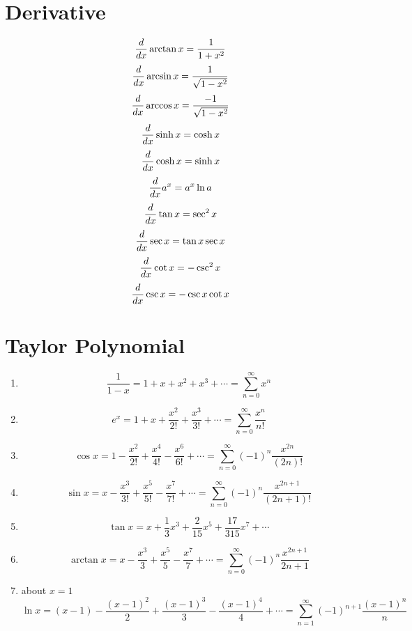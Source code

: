 \documentclass[12pt]{article}
\theoremstyle{plain}
\begin{document}
	\section{Derivative}
		\[
			\frac d{dx}\arctan x = \frac1{1+x^2}\\
		\]
		\[
			\frac d{dx}\arcsin x = \frac1{\sqrt{1-x^2}}\\
		\]
		\[
			\frac d{dx}\arccos x = \frac{-1}{\sqrt{1-x^2}}\\
		\]
		\[
			\frac d{dx} \sinh x = \cosh x\\
		\]
		\[
			\frac d{dx} \cosh x = \sinh x\\
		\]
		\[
			\frac d{dx} a^x = a^x \ln a\\
		\]
		\[
			\frac d{dx} \tan x = \sec^2 x\\
		\]
		\[
			\frac d{dx} \sec x = \tan x \sec x\\
		\]
		\[
			\frac d{dx} \cot x = -\csc ^ 2 x \\
		\]
		\[
			\frac d{dx} \csc x = -\csc x\cot x\\
		\]


	\section{Taylor Polynomial}
	\begin{enumerate}
		\item 
			\[
				\frac1{1-x}=1+x+x^2+x^3+\cdots = \sum_{n=0}^{\infty}x^n
			\]
		\item
			\[
				e^x=1+x+\frac{x^2}{2!}+\frac{x^3}{3!}+\cdots
				=\sum_{n=0}^{\infty}\frac{x^n}{n!}
			\]
		\item
			\[
				\cos x = 1 -\frac{x^2}{2!}+\frac{x^4}{4!}-\frac{x^6}{6!}+\cdots
				=\sum_{n=0}^{\infty}(-1)^n \frac{x^{2n}}{(2n)!}
			\]
		\item 
			\[
				\sin x = x-\frac{x^3}{3!}+\frac{x^5}{5!}-\frac{x^7}{7!}+\cdots
				=\sum_{n=0}^{\infty}(-1)^n \frac{x^{2n+1}}{(2n+1)!}
			\]
		\item
			\[
				\tan x = x+\frac13 x^3+\frac2{15}x^5+\frac{17}{315}x^7+\cdots
			\]
		\item
			\[
				\arctan x = x-\frac{x^3}3+\frac{x^5}5-\frac{x^7}7+\cdots
				=\sum_{n=0}^{\infty}(-1)^n\frac{x^{2n+1}}{2n+1}
			\]
		\item about $x=1$
			\[
				\ln x = (x-1)-\frac{(x-1)^2}{2}+\frac{(x-1)^3}3-\frac{(x-1)^4}4+\cdots
				=\sum_{n=1}^{\infty}(-1)^{n+1}\frac{(x-1)^n}n
			\]
	\end{enumerate}
\end{document}
